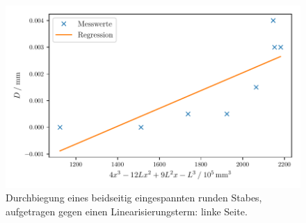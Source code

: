 \begin{figure}
  \centering
  \includegraphics[scale=0.8]{build/plot_beidseitig_rund_links.pdf}
  \caption{Durchbiegung eines beidseitig eingespannten runden Stabes, aufgetragen gegen einen Linearisierungsterm: linke Seite.}
  \label{fig:regression4}
\end{figure}
